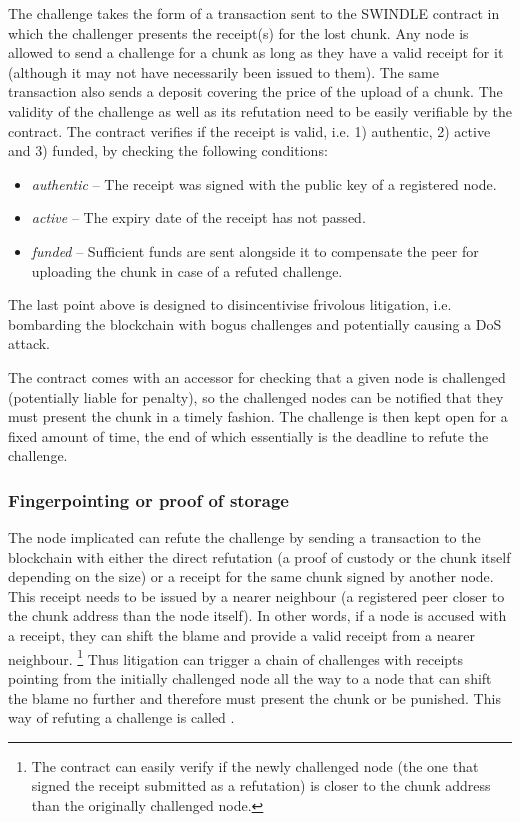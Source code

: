 The challenge takes the form of a transaction sent to the SWINDLE contract in which the challenger presents the receipt(s) for the lost chunk. Any node is allowed to send a challenge for a chunk as long as they have a valid receipt for it (although it may not have necessarily been issued to them). The same transaction also sends a deposit covering the price of the upload of a chunk. The validity of the challenge as well as its refutation need to be easily verifiable by the contract.
The contract verifies if the receipt is valid, i.e. 1) authentic, 2) active and 3) funded, by checking the following conditions:

\begin{itemize}
\item \emph{authentic} -- The receipt was signed with the public key of a registered node.
\item \emph{active} -- The expiry date of the receipt has not passed.
\item \emph{funded} -- Sufficient funds are sent alongside it to compensate the peer for uploading the chunk in case of a refuted challenge.
\end{itemize}

The last point above is designed to disincentivise frivolous litigation, i.e. bombarding the blockchain with bogus challenges and potentially causing a DoS attack.

The contract comes with an accessor for checking that a given node is challenged (potentially liable for penalty), so the challenged nodes can be notified that they must present the chunk in a timely fashion. The challenge is then kept open for a fixed amount of time, the end of which essentially is the deadline to refute the challenge. 


\subsubsection{Fingerpointing or proof of storage}


The node implicated can refute the challenge by sending a transaction to the blockchain with either the direct refutation (a proof of custody or the chunk itself depending on the size) or a receipt for the same chunk signed by another node. This receipt needs to be issued by a nearer neighbour (a registered peer closer to the chunk address than the node itself). In other words, if a node is accused with a receipt, they can  shift the blame and provide a valid receipt from a nearer neighbour.%
%
\footnote{The contract can easily verify if the newly challenged node (the one that signed the receipt submitted as a refutation) is closer to the chunk address than the originally challenged node.}
%
Thus litigation can trigger a chain of challenges with receipts pointing from the initially challenged node all the way to a node that can shift the blame no further and therefore must present the chunk or be punished. This way of refuting a challenge is called . 

